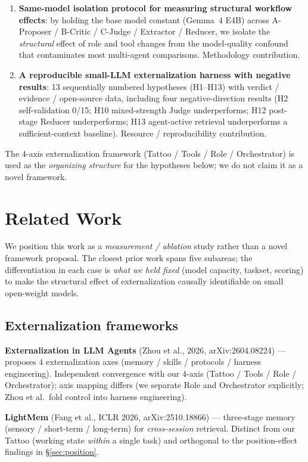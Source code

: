 \documentclass[11pt]{article}
\begin{document}
\begin{enumerate}[leftmargin=*]
\item \textbf{Same-model isolation protocol for measuring structural workflow effects}: by holding the base model constant (Gemma~4 E4B) across A-Proposer / B-Critic / C-Judge / Extractor / Reducer, we isolate the \emph{structural} effect of role and tool changes from the model-quality confound that contaminates most multi-agent comparisons. Methodology contribution.

\item \textbf{A reproducible small-LLM externalization harness with negative results}: 13 sequentially numbered hypotheses (H1--H13) with verdict / evidence / open-source data, including four negative-direction results (H2 self-validation 0/15; H10 mixed-strength Judge underperforms; H12 post-stage Reducer underperforms; H13 agent-active retrieval underperforms a sufficient-context baseline). Resource / reproducibility contribution.
\end{enumerate}

The 4-axis externalization framework (Tattoo / Tools / Role / Orchestrator) is used as the \emph{organizing structure} for the hypotheses below; we do not claim it as a novel framework.

\section{Related Work}

We position this work as a \emph{measurement / ablation} study rather than a novel framework proposal. The closest prior work spans five subareas; the differentiation in each case is \emph{what we held fixed} (model capacity, taskset, scoring) to make the structural effect of externalization causally identifiable on small open-weight models.

\subsection{Externalization frameworks}
\textbf{Externalization in LLM Agents} (Zhou et al., 2026, arXiv:2604.08224) --- proposes 4 externalization axes (memory / skills / protocols / harness engineering). Independent convergence with our 4-axis (Tattoo / Tools / Role / Orchestrator); axis mapping differs (we separate Role and Orchestrator explicitly; Zhou et al.\ fold control into harness engineering).
\par\smallskip
\textbf{LightMem} (Fang et al., ICLR 2026, arXiv:2510.18866) --- three-stage memory (sensory / short-term / long-term) for \emph{cross-session} retrieval. Distinct from our Tattoo (working state \emph{within} a single task) and orthogonal to the position-effect findings in \S\ref{sec:position}.
\end{document}
